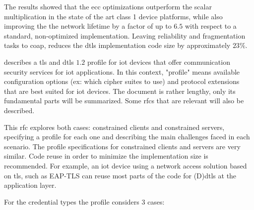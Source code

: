 \documentclass{llncs}
\begin{document}
The results showed that the \gls{ecc} optimizations
outperform the scalar multiplication in the state of the art class 1 device platforms,
while also improving the the network lifetime by a factor of up to $6.5$ with
respect to a standard, non-optimized implementation. Leaving reliability and
fragmentation tasks to \gls{coap}, reduces the \gls{dtls} implementation code size
by approximately $23\%$.

\cite{RFC7925} describes a \gls{tls} and \gls{dtls} $1.2$
profile for \gls{iot} devices that offer communication security services
for \gls{iot} applications.
In this context, "profile" means available configuration options (ex: which
cipher suites to use) and protocol extensions that are best suited for \gls{iot} devices.
The document is rather lengthy, only its fundamental parts will be summarized. Some \gls{rfc}s that are relevant will also be described.

This \gls{rfc} explores both cases: constrained clients and constrained servers, specifying
a profile for each one and describing the main challenges faced in each scenario.
The profile specifications for constrained clients and servers are very similar.
Code reuse in order to minimize the implementation size is recommended. For example, an \gls{iot} device
using a network access solution based on \gls{tls}, such as EAP-TLS\cite{rfc5216}
can reuse most parts of the code for (D)\gls{dtls} at the application layer.

For the credential types the profile considers 3 cases:
\end{document}
